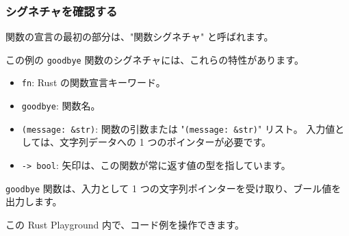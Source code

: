 \subsubsection{シグネチャを確認する}

関数の宣言の最初の部分は、"関数シグネチャ" と呼ばれます。

この例の \texttt{goodbye} 関数のシグネチャには、これらの特性があります。

\begin{itemize}
\item \texttt{fn}: Rust の関数宣言キーワード。
\item \texttt{goodbye}: 関数名。
\item \texttt{(message: \&str)}: 関数の引数または "\texttt{(message: \&str)}" リスト。 入力値としては、文字列データへの 1 つのポインターが必要です。
\item \texttt{-> bool}: 矢印は、この関数が常に返す値の型を指しています。
\end{itemize}

\texttt{goodbye} 関数は、入力として 1 つの文字列ポインターを受け取り、ブール値を出力します。

この Rust Playground 内で、コード例を操作できます。

